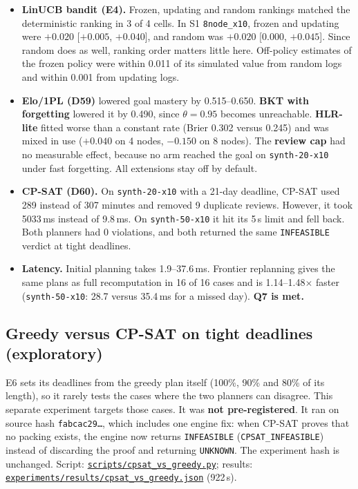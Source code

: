 \documentclass[11pt,a4paper]{article}
\newcommand{\finaltag}{cs5903-final-2026}
\newcommand{\repobase}{https://github.com/vhemanth06/AdaptEngine}
\newcommand{\repo}[1]{\href{\repobase/blob/\finaltag/#1}{\nolinkurl{#1}}}
\begin{document}
\begin{itemize}
\item \textbf{LinUCB bandit (E4).} Frozen, updating and random rankings matched the deterministic ranking in 3 of 4 cells. In S1 \texttt{8node\_x10}, frozen and updating were $+0.020$ [$+0.005$, $+0.040$], and random was $+0.020$ [0.000, $+0.045$]. Since random does as well, ranking order matters little here. Off-policy estimates of the frozen policy were within 0.011 of its simulated value from random logs and within 0.001 from updating logs.
\item \textbf{Elo/1PL (D59)} lowered goal mastery by 0.515--0.650. \textbf{BKT with forgetting} lowered it by 0.490, since $\theta=0.95$ becomes unreachable. \textbf{HLR-lite} fitted worse than a constant rate (Brier 0.302 versus 0.245) and was mixed in use ($+0.040$ on 4 nodes, $-0.150$ on 8 nodes). The \textbf{review cap} had no measurable effect, because no arm reached the goal on \texttt{synth-20-x10} under fast forgetting. All extensions stay off by default.
\item \textbf{CP-SAT (D60).} On \texttt{synth-20-x10} with a 21-day deadline, CP-SAT used 289 instead of 307 minutes and removed 9 duplicate reviews. However, it took 5033\,ms instead of 9.8\,ms. On \texttt{synth-50-x10} it hit its 5\,s limit and fell back. Both planners had 0 violations, and both returned the same \texttt{INFEASIBLE} verdict at tight deadlines.
\item \textbf{Latency.} Initial planning takes 1.9--37.6\,ms. Frontier replanning gives the same plans as full recomputation in 16 of 16 cases and is 1.14--1.48$\times$ faster (\texttt{synth-50-x10}: 28.7 versus 35.4\,ms for a missed day). \textbf{Q7 is met.}
\end{itemize}

\subsection{Greedy versus CP-SAT on tight deadlines (exploratory)}
\label{sec:cpsat}

E6 sets its deadlines from the greedy plan itself (100\%, 90\% and 80\% of its length), so it rarely tests the cases where the two planners can disagree. This separate experiment targets those cases. It was \textbf{not pre-registered}. It ran on source hash \texttt{fabcac29\ldots}, which includes one engine fix: when CP-SAT proves that no packing exists, the engine now returns \texttt{INFEASIBLE} (\texttt{CPSAT\_INFEASIBLE}) instead of discarding the proof and returning \texttt{UNKNOWN}. The experiment hash is unchanged. Script: \repo{scripts/cpsat_vs_greedy.py}; results: \repo{experiments/results/cpsat_vs_greedy.json} (922\,s).
\end{document}
